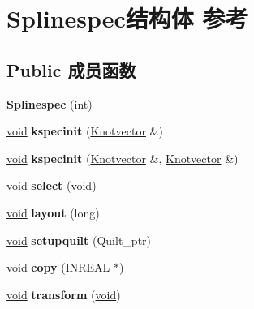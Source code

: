 \hypertarget{struct_splinespec}{}\section{Splinespec结构体 参考}
\label{struct_splinespec}
\subsection*{Public 成员函数}
\begin{DoxyCompactItemize}
\item 
\mbox{\label{struct_splinespec_af462f96e1f368082a875d87a3b67ce95}} 
{\bfseries Splinespec} (int)
\item 
\mbox{\label{struct_splinespec_a04a89242542ed943541cb43e7fdeb97c}} 
\hyperlink{interfacevoid}{void} {\bfseries kspecinit} (\hyperlink{struct_knotvector}{Knotvector} \&)
\item 
\mbox{\label{struct_splinespec_ad36f20a384766099791170f084309372}} 
\hyperlink{interfacevoid}{void} {\bfseries kspecinit} (\hyperlink{struct_knotvector}{Knotvector} \&, \hyperlink{struct_knotvector}{Knotvector} \&)
\item 
\mbox{\label{struct_splinespec_a78a1ef0e6d452673f8a178f0493e2404}} 
\hyperlink{interfacevoid}{void} {\bfseries select} (\hyperlink{interfacevoid}{void})
\item 
\mbox{\label{struct_splinespec_ac27082edf9d3cd497887f2eb39e7a6c3}} 
\hyperlink{interfacevoid}{void} {\bfseries layout} (long)
\item 
\mbox{\label{struct_splinespec_ab8a3570986439acc856cb860f7e1629a}} 
\hyperlink{interfacevoid}{void} {\bfseries setupquilt} (Quilt\+\_\+ptr)
\item 
\mbox{\label{struct_splinespec_a2f97d801fedd86862cc3cec7046fb6cf}} 
\hyperlink{interfacevoid}{void} {\bfseries copy} (I\+N\+R\+E\+AL $\ast$)
\item 
\mbox{\label{struct_splinespec_ad27377eeb2e128761820ec252593949b}} 
\hyperlink{interfacevoid}{void} {\bfseries transform} (\hyperlink{interfacevoid}{void})
\end{DoxyCompactItemize}

